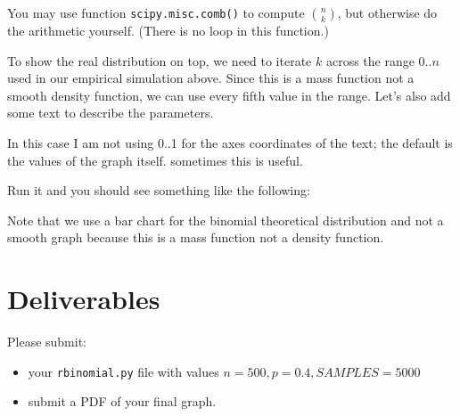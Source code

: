 \begin{fullwidth}
\noindent You may use function {\tt scipy.misc.comb()} to compute $n \choose k$, but otherwise do the arithmetic yourself. (There is no loop in this function.)

\step To show the real distribution on top, we need to iterate $k$ across the range $0..n$ used in our empirical  simulation above.  Since this is a mass function not a smooth density function, we can use every fifth value in the range. Let's also add some text to describe the parameters.


In this case I am not using 0..1 for the axes coordinates of the text; the default is the values of the graph itself. sometimes this is useful.

\step Run it and you should see something like the following:


Note that we use a bar chart for the binomial theoretical distribution and not a smooth graph because this is a mass function not a density function.

\section{Deliverables}

Please submit:

\begin{itemize}
\item your {\tt rbinomial.py} file with values $n=500, p=0.4, SAMPLES=5000$
\item submit a PDF of your final graph.
\end{itemize}

\end{fullwidth}
